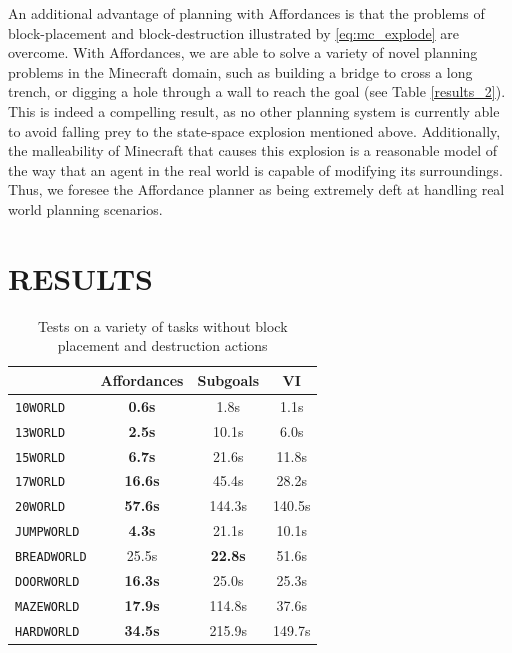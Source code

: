 \documentclass[]{article}
\begin{document}
An additional advantage of planning with Affordances is that the 
problems of block-placement and block-destruction illustrated by 
\ref{eq:mc_explode} are overcome. With Affordances, we are able 
to solve a variety of novel planning problems in the Minecraft 
domain, such as building a bridge to cross a long trench, or digging 
a hole through a wall to reach the goal (see Table \ref{results_2}). 
This is indeed a compelling result, as no other planning system is 
currently able to avoid falling prey to the state-space explosion 
mentioned above. Additionally, the malleability of Minecraft that 
causes this explosion is a reasonable model of the way that an 
agent in the real world is capable of modifying its surroundings. 
Thus, we foresee the Affordance planner as being extremely deft 
at handling real world planning scenarios.

\section{RESULTS}

\begin{table}
\begin{tabular}{ l || c | c | c }
  & Affordances & Subgoals & VI \\
  \hline
  \texttt{10WORLD} 		&	{\bf 0.6s} 		&	 1.8s 		& 1.1s  \\
  \texttt{13WORLD} 		&	{\bf 2.5s} 	 	& 	10.1s 		& 6.0s  \\
  \texttt{15WORLD} 		&	{\bf 6.7s} 	 	& 	21.6s 		& 11.8s  \\
  \texttt{17WORLD} 		& 	{\bf 16.6s} 	& 	45.4s 		& 28.2s  \\
  \texttt{20WORLD} 		& 	{\bf 57.6s} 	& 	144.3s 		& 140.5s  \\
  \texttt{JUMPWORLD}  	& 	{\bf 4.3s} 		& 	21.1s 		& 10.1s \\
  \texttt{BREADWORLD}  	& 	25.5s		& 	{\bf 22.8s} 	& 51.6s \\
  \texttt{DOORWORLD}  	& 	{\bf 16.3s} 	& 	25.0s 		& 25.3s \\
  \texttt{MAZEWORLD}  	& 	{\bf 17.9s} 	& 	114.8s		& 37.6s \\
  \texttt{HARDWORLD} 	& 	{\bf 34.5s}  	& 	215.9s 		& 149.7s
\end{tabular} 
\label{results_1}
\caption{Tests on a variety of tasks without block placement and destruction actions}
\end{table}

\vspace{4 mm}
\end{document}
